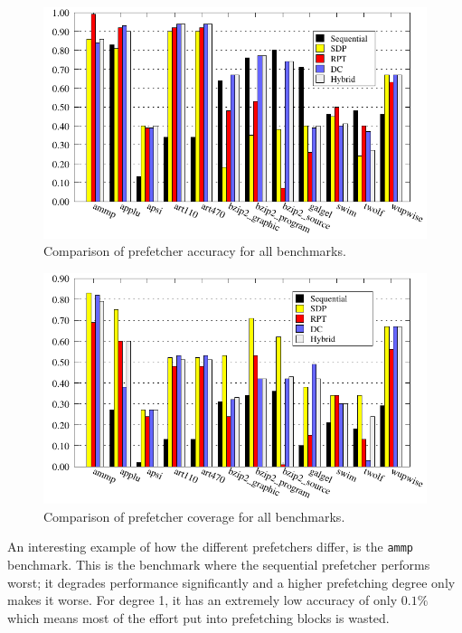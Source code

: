 \begin{figure}
  \centering
  \includegraphics{plots/accuracy_overview.pdf}
  \caption{Comparison of prefetcher accuracy for all benchmarks.}
  \label{fig:accuracy}
\end{figure}

\begin{figure}
  \centering
  \includegraphics{plots/coverage_overview.pdf}
  \caption{Comparison of prefetcher coverage for all benchmarks.}
  \label{fig:coverage}
\end{figure}


An interesting example of how the different prefetchers differ, is the
\texttt{ammp} benchmark.   This is the benchmark where the sequential prefetcher performs worst; it
degrades performance significantly and a higher prefetching degree only makes
it worse.  For degree 1, it has an extremely low accuracy of only $0.1\%$ which
means most of the effort put into prefetching blocks is wasted.

